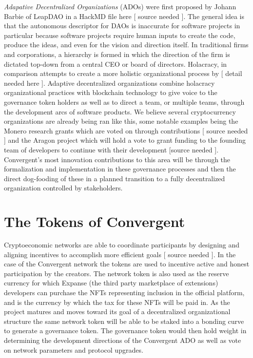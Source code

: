 \documentclass[a4paper]{article}
\begin{document}
	\textit{Adapative Decentralized Organizations} (ADOs) were first proposed by Johann Barbie of LeapDAO in a HackMD file here [ source needed ]. The general idea is that the autonomous descriptor for DAOs is inaccurate for software projects in particular because software projects require human inputs to create the code, produce the ideas, and even for the vision and direction itself. In traditional firms and corporations, a hierarchy is formed in which the direction of the firm is dictated top-down from a central CEO or board of directors. Holacracy, in comparison attempts to create a more holistic organizational process by [ detail needed here ]. Adaptive decentralized organizations combine holacracy organizational practices with blockchain technology to give voice to the governance token holders as well as to direct a team, or multiple teams, through the development arcs of software products. We believe several cryptocurrency organizations are already being ran like this, some notable examples being the Monero research grants which are voted on through contributions [ source needed ] and the Aragon project which will hold a vote to grant funding to the founding team of developers to continue with their development [source needed ]. Convergent's most innovation contributions to this area will be through the formalization and implementation in these governance processes and then the direct dog-fooding of these in a planned transition to a fully decentralized organization controlled by stakeholders.

\section{The Tokens of Convergent}

Cryptoeconomic networks are able to coordinate participants by designing and aligning incentives to accomplish more efficient goals [ source needed ]. In the case of the Convergent network the tokens are used to incentive active and honest participation by the creators. The network token is also used as the reserve currency for which Expanse (the third party marketplace of extensions) developers can purchase the NFTs representing inclusion in the official platform, and is the currency by which the tax for these NFTs will be paid in. As the project matures and moves toward its goal of a decentralized organizational structure the same network token will be able to be staked into a bonding curve to generate a governance token. The governance token would then hold weight in determining the development directions of the Convergent ADO as well as vote on network parameters and protocol upgrades. 
\end{document}

